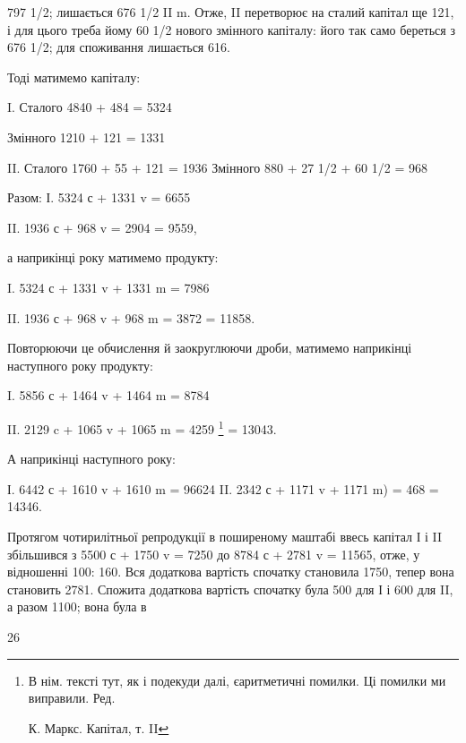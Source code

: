 797 1/2; лишається 676 1/2 II m. Отже, II перетворює на сталий капітал
ще 121, і для цього треба йому 60 1/2 нового змінного капіталу: його
так само береться з 676 1/2; для споживання лишається 616.

Тоді матимемо капіталу:

I. Сталого 4840 + 484 = 5324

Змінного 1210 + 121 = 1331

II. Сталого 1760 + 55 + 121 = 1936
Змінного 880 + 27 1/2 + 60 1/2 = 968

Разом: І. 5324 с + 1331 v = 6655

II. 1936 с + 968 v = 2904
= 9559,

а наприкінці року матимемо продукту:

I.    5324 с + 1331 v + 1331 m = 7986

II.    1936 с + 968 v + 968 m = 3872
= 11858.

Повторюючи це обчислення й заокруглюючи дроби, матимемо наприкінці
наступного року продукту:

I.    5856 с + 1464 v + 1464 m = 8784

II.    2129 c + 1065 v + 1065 m = 4259 \footnote*{
В нім. тексті тут, як і подекуди далі, єаритметичні помилки. Ці помилки ми
виправили. Ред.

К. Маркс. Капітал, т. II
}
= 13043.

А наприкінці наступного року:

І. 6442 с + 1610 v + 1610 m = 96624
II. 2342 с + 1171 v + 1171 m) = 468
= 14346.

Протягом чотирилітньої репродукції в поширеному маштабі ввесь
капітал І і II збільшився з 5500 с + 1750 v = 7250 до 8784 с + 2781 v =
11565, отже, у відношенні 100: 160. Вся додаткова вартість спочатку
становила 1750, тепер вона становить 2781. Спожита додаткова вартість
спочатку була 500 для І і 600 для II, а разом 1100; вона була в

26
